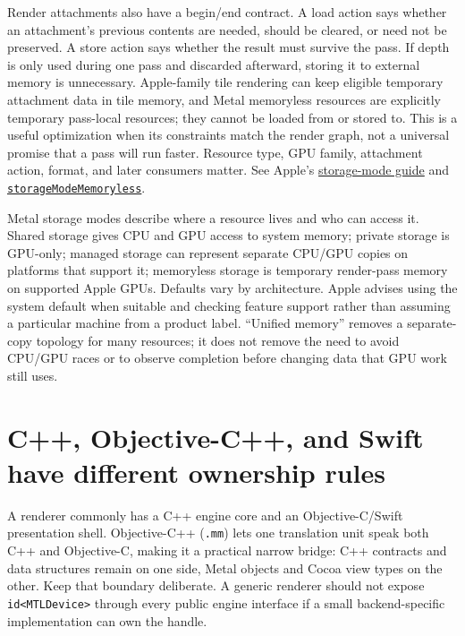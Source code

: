 Render attachments also have a begin/end contract. A load action says whether an attachment's previous contents are needed, should be cleared, or need not be preserved. A store action says whether the result must survive the pass. If depth is only used during one pass and discarded afterward, storing it to external memory is unnecessary. Apple-family tile rendering can keep eligible temporary attachment data in tile memory, and Metal memoryless resources are explicitly temporary pass-local resources; they cannot be loaded from or stored to. This is a useful optimization when its constraints match the render graph, not a universal promise that a pass will run faster. Resource type, GPU family, attachment action, format, and later consumers matter. See Apple's \href{https://developer.apple.com/documentation/metal/setting-resource-storage-modes}{storage-mode guide} and \href{https://developer.apple.com/documentation/metal/mtlresourceoptions/storagemodememoryless}{\texttt{storageModeMemoryless}}.

Metal storage modes describe where a resource lives and who can access it. Shared storage gives CPU and GPU access to system memory; private storage is GPU-only; managed storage can represent separate CPU/GPU copies on platforms that support it; memoryless storage is temporary render-pass memory on supported Apple GPUs. Defaults vary by architecture. Apple advises using the system default when suitable and checking feature support rather than assuming a particular machine from a product label. ``Unified memory'' removes a separate-copy topology for many resources; it does not remove the need to avoid CPU/GPU races or to observe completion before changing data that GPU work still uses.

\section{C++, Objective-C++, and Swift have different ownership rules}\label{01-foundations-i-ch011-c-objective-c-and-swift-have-different-ownership-rules}

\hypertarget{01-foundations-i-ch011-c-objective-c-and-swift-have-different-ownership-rules}{}

A renderer commonly has a C++ engine core and an Objective-C/Swift presentation shell. Objective-C++ (\texttt{.mm}) lets one translation unit speak both C++ and Objective-C, making it a practical narrow bridge: C++ contracts and data structures remain on one side, Metal objects and Cocoa view types on the other. Keep that boundary deliberate. A generic renderer should not expose \texttt{id\textless{}MTLDevice\textgreater{}} through every public engine interface if a small backend-specific implementation can own the handle.

